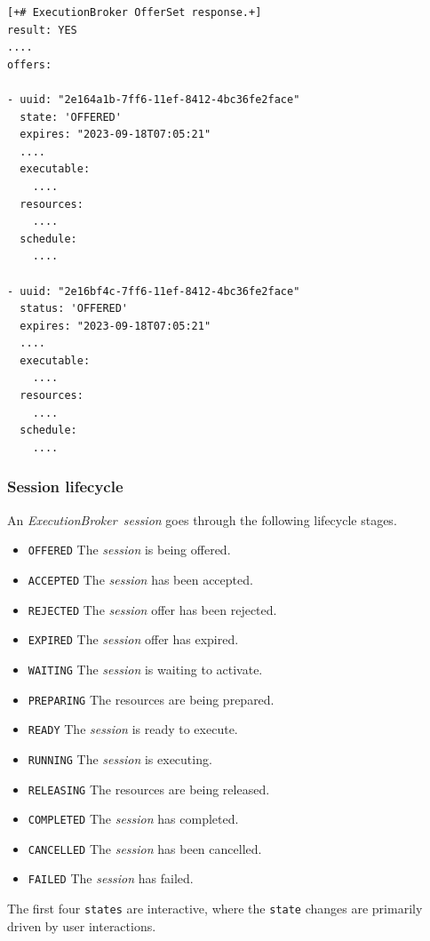 \documentclass[11pt,a4paper]{ivoa}
\newcommand{\execbrokersession}[1] {\textit{ExecutionBroker~session#1}}
\newcommand{\execbrokerstate}[1] {\codeword{state#1}}
\newcommand{\workerjob}[1] {\textit{session#1}}
\newcommand{\codeword}[1] {\texttt{#1}}
\begin{document}
\begin{lstlisting}[]
[+# ExecutionBroker OfferSet response.+]
result: YES
....
offers:

- uuid: "2e164a1b-7ff6-11ef-8412-4bc36fe2face"
  state: 'OFFERED'
  expires: "2023-09-18T07:05:21"
  ....
  executable:
    ....
  resources:
    ....
  schedule:
    ....

- uuid: "2e16bf4c-7ff6-11ef-8412-4bc36fe2face"
  status: 'OFFERED'
  expires: "2023-09-18T07:05:21"
  ....
  executable:
    ....
  resources:
    ....
  schedule:
    ....
\end{lstlisting}

\subsubsection{Session lifecycle}
\label{subsub-session-lifecycle}

An \execbrokersession{} goes through the following lifecycle stages.

\begin{itemize}
    \item \codeword{OFFERED}    The \workerjob{} is being offered.
    \item \codeword{ACCEPTED}   The \workerjob{} has been accepted.
    \item \codeword{REJECTED}   The \workerjob{} offer has been rejected.
    \item \codeword{EXPIRED}    The \workerjob{} offer has expired.
    \item \codeword{WAITING}    The \workerjob{} is waiting to activate.
    \item \codeword{PREPARING}  The resources are being prepared.
    \item \codeword{READY}      The \workerjob{} is ready to execute.
    \item \codeword{RUNNING}    The \workerjob{} is executing.
    \item \codeword{RELEASING}  The resources are being released.
    \item \codeword{COMPLETED}  The \workerjob{} has completed.
    \item \codeword{CANCELLED}  The \workerjob{} has been cancelled.
    \item \codeword{FAILED}     The \workerjob{} has failed.
\end{itemize}

The first four \execbrokerstate{s} are interactive, where the \execbrokerstate{} changes
are primarily driven by user interactions.
\end{document}
